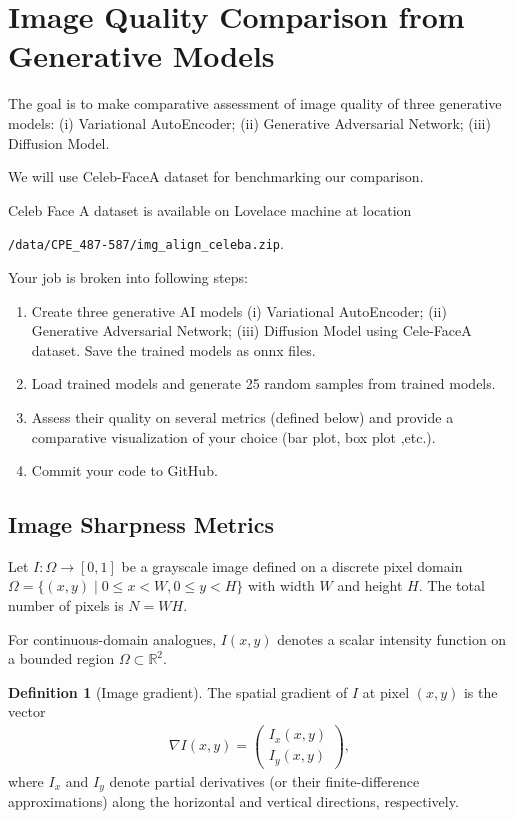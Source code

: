 \documentclass[12pt, xcolor=dvipsnames,svgnames,x11names]{article}
\theoremstyle{definition}
\newtheorem{definition}{Definition}[section]
\begin{document}
\section{Image Quality Comparison from Generative Models}

The goal is to make comparative assessment of image quality of three generative models: (i) Variational AutoEncoder; (ii) Generative Adversarial Network; (iii) Diffusion Model.

We will use Celeb-FaceA dataset for benchmarking our comparison.

Celeb Face A dataset is available on Lovelace machine at location 

\texttt{/data/CPE\_487-587/img\_align\_celeba.zip}.

Your job is broken into following steps:

\begin{enumerate}
\item Create three generative AI models (i) Variational AutoEncoder; (ii) Generative Adversarial Network; (iii) Diffusion Model using Cele-FaceA dataset. Save the trained models as onnx files.

\item Load trained models and generate 25 random samples from trained models.

\item Assess their quality on several metrics (defined below) and provide a comparative visualization of your choice (bar plot, box plot ,etc.).

\item Commit your code to GitHub.
\end{enumerate}


\subsection{Image Sharpness Metrics}

Let $I : \Omega \to [0,1]$ be a grayscale image defined on a discrete pixel
domain $\Omega = \{(x,y) \mid 0 \le x < W, 0 \le y < H\}$ with width $W$
and height $H$.  The total number of pixels is $N = WH$.

For continuous-domain analogues, $I(x,y)$ denotes a scalar intensity function
on a bounded region $\Omega \subset \mathbb{R}^2$.

\begin{definition}[Image gradient]
The spatial gradient of $I$ at pixel $(x,y)$ is the vector
\begin{align*}
  \nabla I(x,y) =
  \begin{pmatrix} I_x(x,y) \\ I_y(x,y) \end{pmatrix},
\end{align*}
where $I_x$ and $I_y$ denote partial derivatives (or their finite-difference
approximations) along the horizontal and vertical directions, respectively.
\end{definition}
\end{document}
